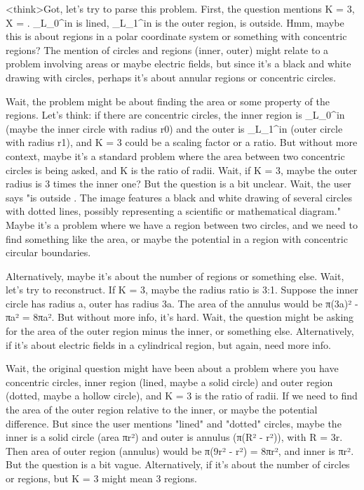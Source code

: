 <think>Got, let's try to parse this problem. First, the question mentions K = 3, X = . _L_0^in is lined, _L_1^in is the outer region, is outside. Hmm, maybe this is about regions in a polar coordinate system or something with concentric regions? The mention of circles and regions (inner, outer) might relate to a problem involving areas or maybe electric fields, but since it's a black and white drawing with circles, perhaps it's about annular regions or concentric circles.

Wait, the problem might be about finding the area or some property of the regions. Let's think: if there are concentric circles, the inner region is _L_0^in (maybe the inner circle with radius r0) and the outer is _L_1^in (outer circle with radius r1), and K = 3 could be a scaling factor or a ratio. But without more context, maybe it's a standard problem where the area between two concentric circles is being asked, and K is the ratio of radii. Wait, if K = 3, maybe the outer radius is 3 times the inner one? But the question is a bit unclear. Wait, the user says "is outside . The image features a black and white drawing of several circles with dotted lines, possibly representing a scientific or mathematical diagram." Maybe it's a problem where we have a region between two circles, and we need to find something like the area, or maybe the potential in a region with concentric circular boundaries.

Alternatively, maybe it's about the number of regions or something else. Wait, let's try to reconstruct. If K = 3, maybe the radius ratio is 3:1. Suppose the inner circle has radius a, outer has radius 3a. The area of the annulus would be π(3a)² - πa² = 8πa². But without more info, it's hard. Wait, the question might be asking for the area of the outer region minus the inner, or something else. Alternatively, if it's about electric fields in a cylindrical region, but again, need more info.

Wait, the original question might have been about a problem where you have concentric circles, inner region (lined, maybe a solid circle) and outer region (dotted, maybe a hollow circle), and K = 3 is the ratio of radii. If we need to find the area of the outer region relative to the inner, or maybe the potential difference. But since the user mentions "lined" and "dotted" circles, maybe the inner is a solid circle (area πr²) and outer is annulus (π(R² - r²)), with R = 3r. Then area of outer region (annulus) would be π(9r² - r²) = 8πr², and inner is πr². But the question is a bit vague. Alternatively, if it's about the number of circles or regions, but K = 3 might mean 3 regions.

